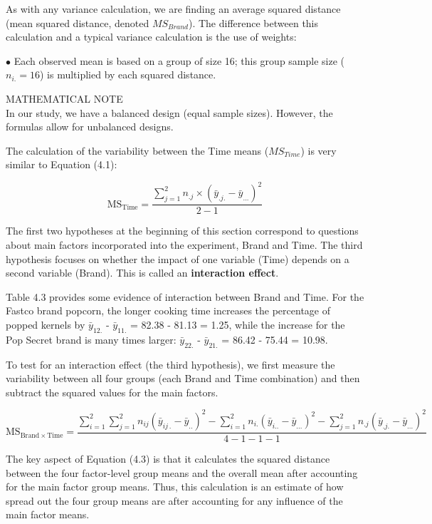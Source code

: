 \documentclass[
]{report}
\theoremstyle{definition}
\theoremstyle{definition}
\theoremstyle{definition}
\theoremstyle{definition}
\theoremstyle{remark}
\begin{document}
As with any variance calculation, we are finding an average squared distance (mean squared distance,
denoted \(MS_{Brand}\)). The difference between this calculation and a typical variance calculation is the use of weights:

\(\bullet\) Each observed mean is based on a group of size 16; this group sample size (\(n_{i.} = 16\)) is multiplied
by each squared distance.

MATHEMATICAL NOTE\\
In our study, we have a balanced design (equal sample sizes). However, the formulas allow for unbalanced designs.

The calculation of the variability between the Time means (\(MS_{Time}\)) is very similar to Equation (4.1):

\begin{equation}
\mathrm{MS}_{\mathrm{Time}}
= \frac{\sum_{j=1}^2 n_{.j} \times (\bar y_{.j.} - \bar y_{...})^2}{2 - 1}
\tag{4.2}
\end{equation}

The first two hypotheses at the beginning of this section correspond to questions about main factors
incorporated into the experiment, Brand and Time. The third hypothesis focuses on whether the impact of
one variable (Time) depends on a second variable (Brand). This is called an \textbf{interaction effect}.

Table 4.3 provides some evidence of interaction between Brand and Time. For the Fastco brand popcorn,
the longer cooking time increases the percentage of popped kernels by \(\bar y_{12.}\) - \(\bar y_{11.}\) = 82.38 - 81.13 = 1.25,
while the increase for the Pop Secret brand is many times larger: \(\bar y_{22.}\) - \(\bar y_{21.}\) = 86.42 - 75.44 = 10.98.

To test for an interaction effect (the third hypothesis), we first measure the variability between all four
groups (each Brand and Time combination) and then subtract the squared values for the main factors.

\begin{equation}
\mathrm{MS}_{\mathrm{Brand}\times\mathrm{Time}}
= \frac{\sum_{i=1}^2 \sum_{j=1}^2 n_{ij}(\bar y_{ij\,.} - \bar y_{..})^2
    - \sum_{i=1}^2 n_{i.}(\bar y_{i..} - \bar y_{...})^2
    - \sum_{j=1}^2 n_{.j}(\bar y_{.j.} - \bar y_{...})^2}
{4 - 1 - 1 - 1}
\tag{4.3}
\end{equation}

The key aspect of Equation (4.3) is that it calculates the squared distance between the four factor-level
group means and the overall mean after accounting for the main factor group means. Thus, this calculation is an
estimate of how spread out the four group means are after accounting for any influence of the main factor means.
\end{document}
